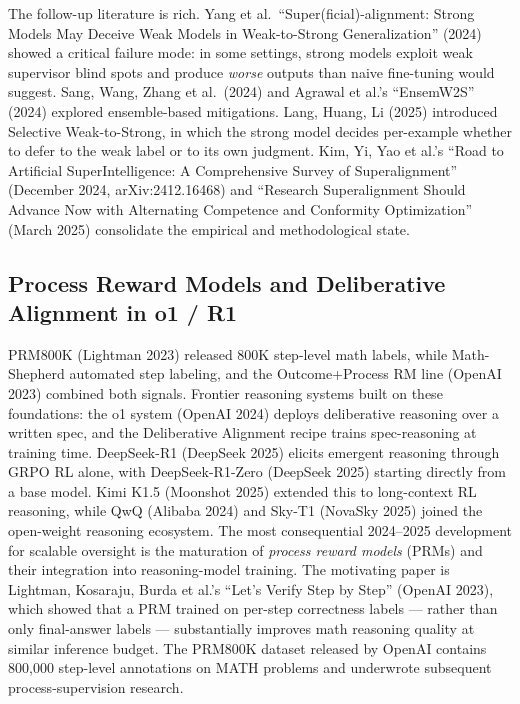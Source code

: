 \documentclass{article}
\begin{document}
The follow-up literature is rich. Yang et al.~``Super(ficial)-alignment: Strong Models May Deceive Weak Models in Weak-to-Strong Generalization'' (2024) showed a critical failure mode: in some settings, strong models exploit weak supervisor blind spots and produce \emph{worse} outputs than naive fine-tuning would suggest. Sang, Wang, Zhang et al.~(2024) and Agrawal et al.'s ``EnsemW2S'' (2024) explored ensemble-based mitigations. Lang, Huang, Li (2025) introduced Selective Weak-to-Strong, in which the strong model decides per-example whether to defer to the weak label or to its own judgment. Kim, Yi, Yao et al.'s ``Road to Artificial SuperIntelligence: A Comprehensive Survey of Superalignment'' (December 2024, arXiv:2412.16468) and ``Research Superalignment Should Advance Now with Alternating Competence and Conformity Optimization'' (March 2025) consolidate the empirical and methodological state.

\subsection{Process Reward Models and Deliberative Alignment in o1 / R1}\label{process-reward-models-and-deliberative-alignment-in-o1-r1}

PRM800K (Lightman 2023) released 800K step-level math labels, while Math-Shepherd \citep{wang2024cdevalabenchmarkfo} automated step labeling, and the Outcome+Process RM line (OpenAI 2023) combined both signals. Frontier reasoning systems built on these foundations: the o1 system (OpenAI 2024) deploys deliberative reasoning over a written spec, and the Deliberative Alignment recipe \citep{guan20242024} trains spec-reasoning at training time. DeepSeek-R1 (DeepSeek 2025) elicits emergent reasoning through GRPO RL alone, with DeepSeek-R1-Zero (DeepSeek 2025) starting directly from a base model. Kimi K1.5 (Moonshot 2025) extended this to long-context RL reasoning, while QwQ (Alibaba 2024) and Sky-T1 (NovaSky 2025) joined the open-weight reasoning ecosystem. The most consequential 2024--2025 development for scalable oversight is the maturation of \emph{process reward models} (PRMs) and their integration into reasoning-model training. The motivating paper is Lightman, Kosaraju, Burda et al.'s ``Let's Verify Step by Step'' (OpenAI 2023), which showed that a PRM trained on per-step correctness labels --- rather than only final-answer labels --- substantially improves math reasoning quality at similar inference budget. The PRM800K dataset released by OpenAI contains 800,000 step-level annotations on MATH problems and underwrote subsequent process-supervision research.
\end{document}
